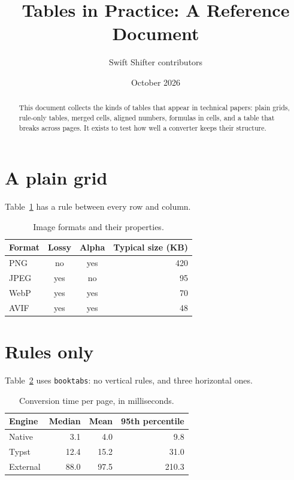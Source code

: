 \documentclass[11pt]{article}
\title{Tables in Practice: A Reference Document}
\author{Swift Shifter contributors}
\date{October 2026}
\begin{document}
\maketitle

\begin{abstract}
This document collects the kinds of tables that appear in technical papers:
plain grids, rule-only tables, merged cells, aligned numbers, formulas in
cells, and a table that breaks across pages. It exists to test how well a
converter keeps their structure.
\end{abstract}

\section{A plain grid}

Table~\ref{tab:grid} has a rule between every row and column.

\begin{table}[h]
  \centering
  \caption{Image formats and their properties.}
  \label{tab:grid}
  \begin{tabular}{|l|c|c|r|}
    \hline
    Format & Lossy & Alpha & Typical size (KB) \\
    \hline
    PNG  & no  & yes & 420 \\
    \hline
    JPEG & yes & no  & 95  \\
    \hline
    WebP & yes & yes & 70  \\
    \hline
    AVIF & yes & yes & 48  \\
    \hline
  \end{tabular}
\end{table}

\section{Rules only}

Table~\ref{tab:booktabs} uses \texttt{booktabs}: no vertical rules, and three
horizontal ones.

\begin{table}[h]
  \centering
  \caption{Conversion time per page, in milliseconds.}
  \label{tab:booktabs}
  \begin{tabular}{lrrr}
    \toprule
    Engine & Median & Mean & 95th percentile \\
    \midrule
    Native   & 3.1  & 4.0  & 9.8   \\
    Typst    & 12.4 & 15.2 & 31.0  \\
    External & 88.0 & 97.5 & 210.3 \\
    \bottomrule
  \end{tabular}
\end{table}
\end{document}
